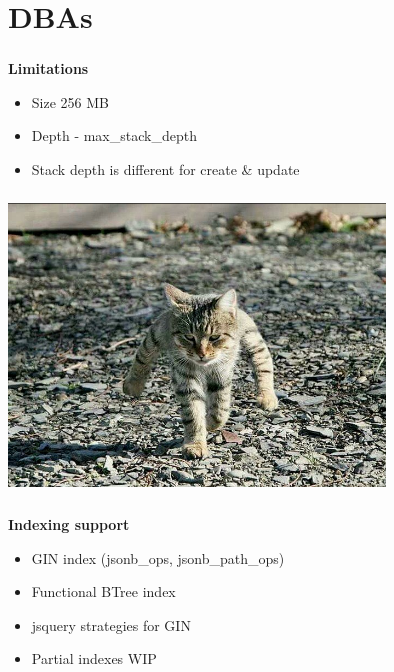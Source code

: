 \documentclass[usenames,dvipsnames, 18pt, compress, aspectratio=169]{beamer}
\begin{document}
\fontsize{13pt}{14}\selectfont
\section{DBAs}
\fontsize{17pt}{18}\selectfont

\begin{frame}
    \frametitle{}
    \begin{center}
    \textbf{Limitations}

        \begin{itemize}[label={}]
            \item Size 256 MB
            \item Depth - max\_stack\_depth
            \item Stack depth is different for create \& update
        \end{itemize}

    \end{center}
\end{frame}

\begin{frame}
    \frametitle{}
    \begin{center}

        \includegraphics[width=0.75\textwidth,center]{cat.png}

    \end{center}
\end{frame}

\begin{frame}
    \frametitle{}
    \begin{center}
        \textbf{Indexing support}

        \begin{itemize}[label={\MVRightarrow}]
            \item GIN index (jsonb\_ops, jsonb\_path\_ops)
            \item Functional BTree index
            \item jsquery strategies for GIN
            \item Partial indexes WIP
        \end{itemize}

    \end{center}
\end{frame}
\end{document}
